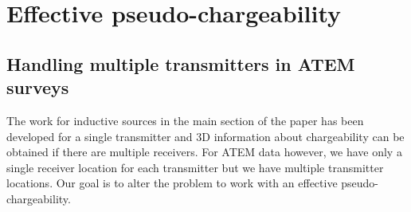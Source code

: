\documentclass[extra,mreferee]{gji}
\begin{document}
\section{Effective pseudo-chargeability}
\subsection{Handling multiple transmitters in ATEM surveys}
\label{subsection: Handling multiple transmitters in ATEM surveys}
The work for inductive sources in the main section of the paper has been developed for a single transmitter and 3D information about chargeability can be obtained if there are multiple receivers. For ATEM data however, we have only a single receiver location for each transmitter but we have multiple transmitter locations. 
Our goal is to alter the problem to work with an effective pseudo-chargeability. 
\end{document}
